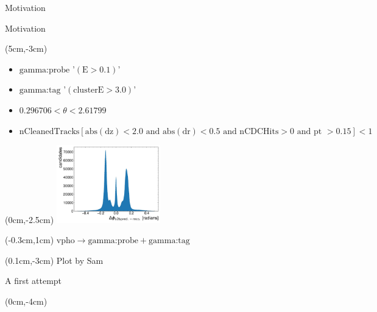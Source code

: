 \documentclass[10pt]{beamer}
\begin{document}
{\begin{frame}{Motivation}
	\end{frame}
	

	
	
\begin{frame}{Motivation}
	\begin{textblock*}{0.5\textwidth}(5cm,-3cm)
		

	
	
	\begin{itemize}
		
		\item $\textrm{gamma:probe}$ '$(\textrm{E} > 0.1 )$'
		\item $\textrm{gamma:tag}$ '$(\textrm{clusterE} > 3.0)$'

			\item $0.296706 < \theta < 2.61799 $
			\item $\textrm{nCleanedTracks}[ \textrm{abs}(\textrm{dz}) < 2.0 \textrm{ and } \textrm{abs}(\textrm{dr}) < 0.5 \textrm{ and nCDCHits} > 0 \textrm{ and pt } > 0.15] < 1  $
						
		\end{itemize}

	\end{textblock*}

	
\begin{textblock*}{0.5\textwidth}(0cm,-2.5cm)
	\includegraphics[width=4.5cm]{Plots/deltaPhiSam}
\end{textblock*}

\begin{textblock*}{0.5\textwidth}(-0.3cm,1cm)
	$\textrm{vpho} \rightarrow \textrm{gamma:probe} + \textrm{gamma:tag}$
\end{textblock*}

\begin{textblock*}{0.5\textwidth}(0.1cm,-3cm)
	Plot by Sam
\end{textblock*}


	
\end{frame}

\begin{frame}{A first attempt}
	\begin{textblock*}{\textwidth}(0cm,-4cm)
	


\end{textblock*}
\end{frame}}
\end{document}
